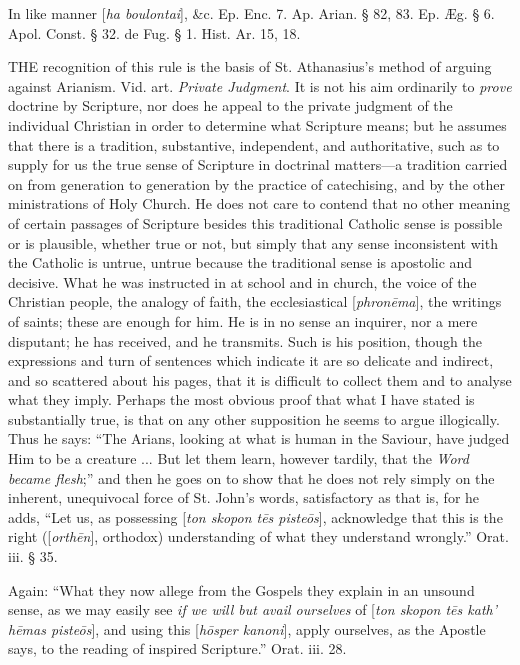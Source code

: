In
like manner [\emph{ha boulontai}], \&c. Ep. Enc. 7. Ap. Arian. §
82, 83. Ep. Æg. § 6. Apol. Const. § 32. de Fug. § 1. Hist. Ar. 15,
18.


THE
recognition of this rule is the basis of St. Athanasius's method of
arguing against Arianism. Vid. art. \emph{Private Judgment}. It is not
his aim ordinarily to \emph{prove} doctrine by Scripture, nor does he
appeal to the private judgment of the individual Christian in order to
determine what Scripture means; but he assumes that there is a
tradition, substantive, independent, and authoritative, such as to
supply for us the true sense of Scripture in doctrinal matters—a
tradition carried on from generation to generation by the practice of
catechising, and by the other ministrations of Holy Church. He does
not care to contend that no other meaning of certain passages of
Scripture besides this traditional Catholic sense is possible or is
plausible, whether true or not, but simply that any sense inconsistent
with the Catholic is untrue, untrue because the traditional sense is
apostolic and decisive. What he was instructed in at school and in
church, the voice of the Christian people, the analogy of faith, the
ecclesiastical [\emph{phron\={e}ma}], the writings of saints; these
are enough for him. He is in no sense an inquirer, nor a mere
disputant; he has received, and he transmits. Such is his position,
though the expressions and turn of sentences which indicate it are so
delicate and indirect, and so scattered about his pages, that it
is difficult to collect them and to analyse what they imply. Perhaps
the most obvious proof that what I have stated is substantially true,
is that on any other supposition he seems to argue illogically. Thus
he says: ``The Arians, looking at what is human in the Saviour, have
judged Him to be a creature ... But let them learn, however tardily,
that the \emph{Word became flesh};'' and then he goes on to show that
he does not rely simply on the inherent, unequivocal force of St. John's
words, satisfactory as that is, for he adds, ``Let us, as possessing [\emph{ton
skopon t\={e}s piste\={o}s}], acknowledge that this is the
right ([\emph{orth\={e}n}], orthodox) understanding of what they
understand wrongly.'' Orat. iii. § 35.

Again:
``What they now allege from the Gospels they explain in an unsound
sense, as we may easily see \emph{if we will but avail ourselves} of [\emph{ton
skopon t\={e}s kath}\emph{'
h\={e}mas piste\={o}s}],
and using this [\emph{h\={o}sper kanoni}], apply ourselves, as the
Apostle says, to the reading of inspired Scripture.'' Orat. iii. 28.

